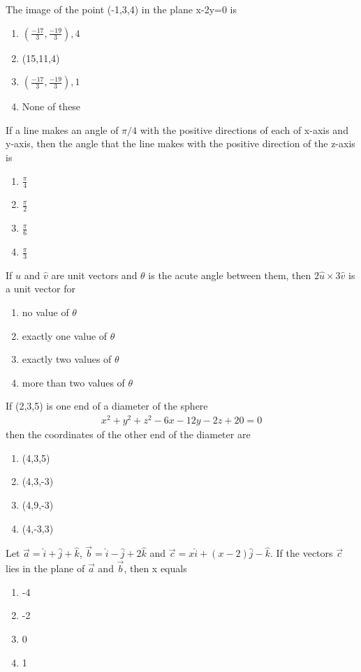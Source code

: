 \item The image of the point (-1,3,4) in the plane x-2y=0 is
\begin{enumerate}
\item $(\frac{-17}{3}, \frac{-19}{3}), 4$
\item (15,11,4)
\item $(\frac{-17}{3}, \frac{-19}{3}), 1$
\item None of these
\end{enumerate}

\item If a line makes an angle of $\pi/4$ with the positive directions of each of x-axis and y-axis, then the angle that the line makes with the positive direction of the z-axis is
\begin{enumerate}
\item $\frac{\pi}{4}$
\item $\frac{\pi}{2}$
\item $\frac{\pi}{6}$
\item $\frac{\pi}{3}$
\end{enumerate}

\item If $\hat{u}$ and $\hat{v}$ are unit vectors and $\theta$ is the acute angle between them, then $2\hat{u} \times 3\hat{v}$ is a unit vector for
\begin{enumerate}
\item no value of $\theta$
\item exactly one value of $\theta$
\item exactly two values of $\theta$
\item more than two values of $\theta$
\end{enumerate}

\item If (2,3,5) is one end of a diameter of the sphere
\begin{align}
x^2+y^2+z^2-6x-12y-2z+20=0
\end{align}
then the coordinates of the other end of the diameter are
\begin{enumerate}
\item (4,3,5)
\item (4,3,-3)
\item (4,9,-3)
\item (4,-3,3)
\end{enumerate}

\item Let $\overrightarrow{a}=\hat{i}+\hat{j}+\hat{k}$, $\overrightarrow{b}=\hat{i}-\hat{j}+2\hat{k}$ and $\overrightarrow{c}=x\hat{i}+(x-2)\hat{j}-\hat{k}$. If the vectors $\overrightarrow{c}$ lies in the plane of $\overrightarrow{a}$ and $\overrightarrow{b}$, then x equals
\begin{enumerate}
\item -4
\item -2
\item 0
\item 1
\end{enumerate}

